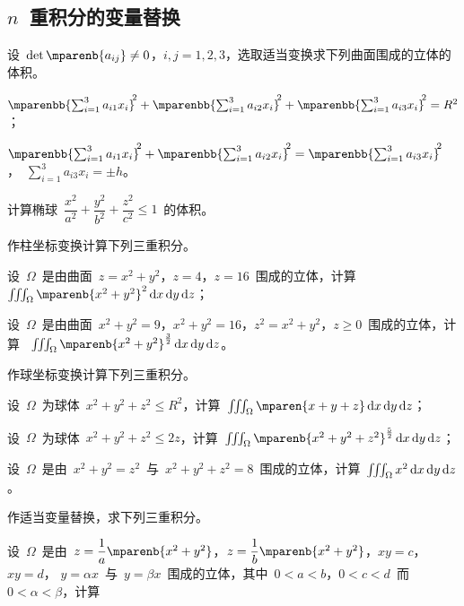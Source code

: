 \subsection{$n$~重积分的变量替换}
\begin{exercise}
\item 设~$\det\mparenb{a_{ij}}\neq0$，$i,j=1,2,3$，选取适当变换求下列曲面围成的立体的体积。
\begin{exlist}
  \item $\mparenbb{\sum_{i=1}^3a_{i1}x_i}^{\msp2}+\mparenbb{\sum_{i=1}^3a_{i2}x_i}^{\msp2}+
         \mparenbb{\sum_{i=1}^3a_{i3}x_i}^{\msp2}=R^2$；
  \item $\mparenbb{\sum_{i=1}^3a_{i1}x_i}^{\msp2}+\mparenbb{\sum_{i=1}^3a_{i2}x_i}^{\msp2}=
         \mparenbb{\sum_{i=1}^3a_{i3}x_i}^{\msp2}$，~$\sum_{i=1}^3a_{i3}x_i=\pm h$。
\end{exlist}
\item 计算椭球~$\dfrac{x^2}{a^2}+\dfrac{y^2}{b^2}+\dfrac{z^2}{c^2}\leq 1$~的体积。
\item 作柱坐标变换计算下列三重积分。
\begin{exlist}
  \item 设~$\Omega$~是由曲面~$z=x^2+y^2$，$z=4$，$z=16$~围成的立体，计算~$\iiint_\Omega\mparenb{x^2+y^2}^2\dif x\dif y\dif z$；
  \item 设~$\Omega$~是由曲面~$x^2+y^2=9$，$x^2+y^2=16$，$z^2=x^2+y^2$，$z\geq0$~围成的立体，计算
  ~$\iiint_\Omega\mparenb{x^2+y^2}^{\frac32}\dif x\dif y\dif z$。
\end{exlist}
\item 作球坐标变换计算下列三重积分。
\begin{exlist}
  \item 设~$\Omega$~为球体~$x^2+y^2+z^2\leq R^2$，计算~$\iiint_\Omega\mparen{x+y+z}\dif x\dif y\dif z$；
  \item 设~$\Omega$~为球体~$x^2+y^2+z^2\leq 2z$，计算~$\iiint_\Omega\mparenb{x^2+y^2+z^2}^{\frac52}\dif x\dif y\dif z$；
  \item 设~$\Omega$~是由~$x^2+y^2=z^2$~与~$x^2+y^2+z^2=8$~围成的立体，计算~$\iiint_\Omega x^2\dif x\dif y\dif z$。
\end{exlist}
\item 作适当变量替换，求下列三重积分。
\begin{exlist}
  \item\label{exer-20.6.5-1}设~$\Omega$~是由~$z=\dfrac1a\mparenb{x^2+y^2}$，$z=\dfrac1b\mparenb{x^2+y^2}$，$xy=c$，$xy=d$，%
  $y=\alpha x$~与~$y=\beta x$~围成的立体，其中~$0<a<b$，$0<c<d$~而~$0<\alpha<\beta$，计算

\end{exlist}
\end{exercise}
